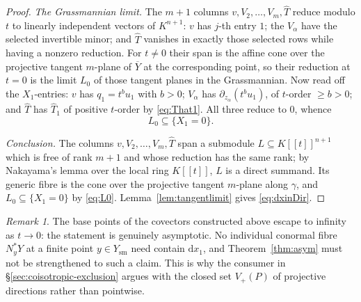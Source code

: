 \documentclass[11pt]{article}
\theoremstyle{plain}
\theoremstyle{definition}
\theoremstyle{remark}
\newtheorem{remark}[theorem]{Remark}
\theoremstyle{plain}
\newcommand{\sm}{\mathrm{sm}}
\newcommand{\dd}{\mathrm{d}}
\begin{document}
\begin{proof}
\emph{The Grassmannian limit.} The $m+1$ columns
$v,V_2,\dots,V_m,\widehat T$ reduce modulo $t$ to linearly independent vectors
of $K^{n+1}$: $v$ has $j$-th entry $1$; the $V_\alpha$ have the selected
invertible minor; and $\widehat T$ vanishes in exactly those selected rows
while having a nonzero reduction. For $t\neq0$ their span is the affine cone
over the projective tangent $m$-plane of $\overline Y$ at the corresponding
point, so their reduction at $t=0$ is the limit $L_0$ of those tangent planes
in the Grassmannian. Now read off the $X_1$-entries: $v$ has
$q_1=t^{b}u_1$ with $b>0$; $V_\alpha$ has $\partial_{z_\alpha}(t^{b}u_1)$,
of $t$-order $\ge b>0$; and $\widehat T$ has $\widehat T_1$ of positive
$t$-order by \eqref{eq:That1}. All three reduce to $0$, whence
\begin{equation}\label{eq:L0}
  L_0\subseteq\{X_1=0\}.
\end{equation}

\emph{Conclusion.} The columns $v,V_2,\dots,V_m,\widehat T$ span a submodule
$L\subseteq K[[t]]^{n+1}$ which is free of rank $m+1$ and whose reduction has
the same rank; by Nakayama's lemma over the local ring $K[[t]]$, $L$ is a
direct summand. Its generic fibre is the cone over the projective tangent
$m$-plane along $\gamma$, and $L_0\subseteq\{X_1=0\}$ by \eqref{eq:L0}.
Lemma~\ref{lem:tangentlimit} gives \eqref{eq:dxinDir}.
\end{proof}

\begin{remark}\label{rem:escape}
The base points of the covectors constructed above escape to infinity as
$t\to0$: the statement is genuinely asymptotic. No individual conormal fibre
$N^*_yY$ at a finite point $y\in Y_{\sm}$ need contain $\dd x_1$, and
Theorem~\ref{thm:asym} must not be strengthened to such a claim. This is why
the consumer in \S\ref{sec:coisotropic-exclusion} argues with the closed set
$V_+(P)$ of projective directions rather than pointwise.
\end{remark}
\end{document}
